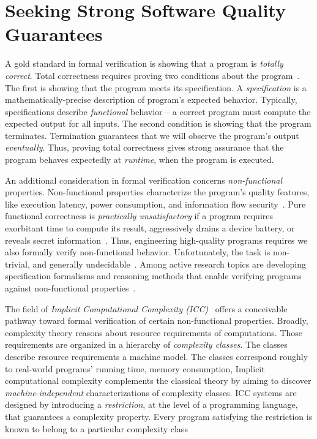 \section{Seeking Strong Software Quality Guarantees}
\label{sec:aicc-intro}

A gold standard in formal verification is showing that a program is \emph{totally correct}.
Total correctness requires proving two conditions about the program~\cite{leino2023}.
The first is showing that the program meets its specification.
A \emph{specification} is a mathematically-precise description of program's expected behavior.
Typically, specifications describe \emph{functional} behavior -- a correct program must compute the expected output for all inputs.
The second condition is showing that the program terminates.
Termination guarantees that we will observe the program's output \emph{eventually}.
Thus, proving total correctness gives strong assurance that the program behaves expectedly at \emph{runtime}, when the program is executed.

An additional consideration in formal verification concerns \emph{non-functional} properties.
Non-functional properties characterize the program's quality features, like execution latency, power consumption, and information flow security~\cite{terbeek2018}.
Pure functional correctness is \emph{practically unsatisfactory} if a program requires exorbitant time to compute its result, aggressively drains a device battery, or reveals secret information~\cite{heraud2011,aubert20222}.
Thus, engineering high-quality programs requires we also formally verify non-functional behavior.
Unfortunately, the task is non-trivial, and generally undecidable~\cite{rice1953}.
Among active research topics are developing specification formalisms and reasoning methods that enable verifying programs against non-functional properties~\cite{etaps2025}.

The field of \emph{Implicit Computational Complexity (ICC)}~\cite{dallago2011} offers a conceivable pathway toward formal verification of certain non-functional properties.
Broadly, {complexity theory} reasons about resource requirements of computations.
Those requirements are organized in a hierarchy of \emph{complexity classes}.
The classes describe resource requirements \wrt a machine model.
The classes correspond roughly to real-world programs' running time, memory consumption, \etc
Implicit computational complexity complements the classical theory by aiming to discover \emph{machine}\hyp{}\emph{independent} characterizations of complexity classes.
ICC systems are designed by introducing a \emph{restriction}, at the level of a programming language, that guarantees a complexity property.
Every program satisfying the restriction is known to belong to a particular complexity class~\cite{pchoux2020}%

